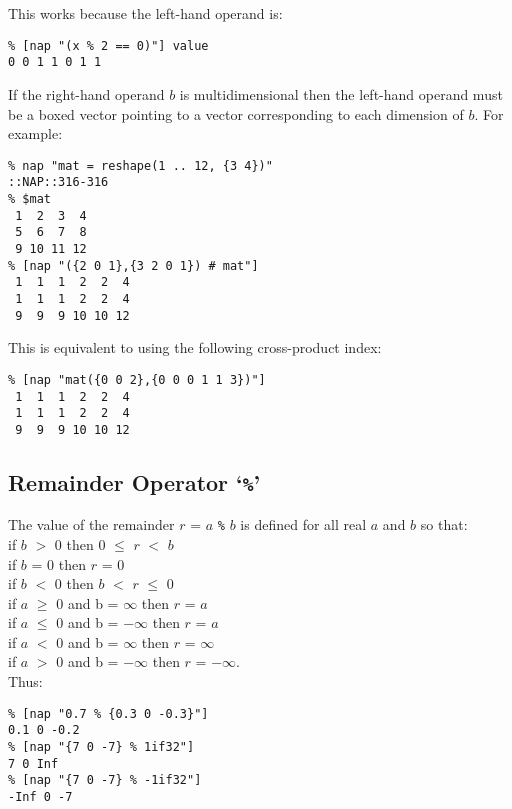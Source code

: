   \par This works because the left-hand operand is:
  \begin{verbatim}
% [nap "(x % 2 == 0)"] value
0 0 1 1 0 1 1
\end{verbatim}

  \par If the right-hand operand 
  $b$ is multidimensional then the left-hand operand must be a
  boxed vector pointing to a vector corresponding to each dimension of 
  $b$. For example:
  \begin{verbatim}
% nap "mat = reshape(1 .. 12, {3 4})"
::NAP::316-316
% $mat
 1  2  3  4
 5  6  7  8
 9 10 11 12
% [nap "({2 0 1},{3 2 0 1}) # mat"]
 1  1  1  2  2  4
 1  1  1  2  2  4
 9  9  9 10 10 12
\end{verbatim}

  \par This is equivalent to using the following cross-product index:
  \begin{verbatim}
% [nap "mat({0 0 2},{0 0 0 1 1 3})"]
 1  1  1  2  2  4
 1  1  1  2  2  4
 9  9  9 10 10 12
\end{verbatim}

  \subsection{
    \label{Remainder}Remainder Operator `\texttt{\%}'
  }
The value of the remainder 
  $r$ = 
  $a$ 
  \texttt{\%} 
  $b$ is defined for all real 
  $a$ and 
  $b$ so that:
  \\if 
  $b$ $>$ 0 then 0 $\le$ 
  $r$ $<$ 
  $b$
  \\if 
  $b$ = 0 then 
  $r$ = 0
  \\if 
  $b$ $<$ 0 then 
  $b$ $<$ 
  $r$ $\le$ 0
  \\if 
  $a$ $\ge$ 0 and b = $\infty$ then 
  $r$ = 
  $a$
  \\if 
  $a$ $\le$ 0 and b = $-$$\infty$ then 
  $r$ = 
  $a$
  \\if 
  $a$ $<$ 0 and b = $\infty$ then 
  $r$ = $\infty$
  \\if 
  $a$ $>$ 0 and b = $-$$\infty$ then 
  $r$ = $-$$\infty$.
  \\Thus:
  \begin{verbatim}
% [nap "0.7 % {0.3 0 -0.3}"]
0.1 0 -0.2
% [nap "{7 0 -7} % 1if32"]
7 0 Inf
% [nap "{7 0 -7} % -1if32"]
-Inf 0 -7
\end{verbatim}

